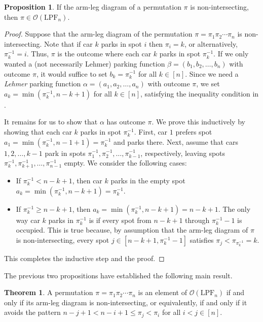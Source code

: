 \documentclass{amsart}
\newcommand{\IT}{\mathrm{LPF}}
\newcommand{\Out}{\mathcal{O}}
\theoremstyle{definition}
\newtheorem{theorem}{Theorem}[section]
\newtheorem{proposition}{Proposition}[section]
\theoremstyle{definition}
\theoremstyle{remark}
\begin{document}
\begin{proposition}\label{prop:backwards1}
   If the arm-leg diagram of a permutation $\pi$ is non-intersecting, then $\pi \in \Out (\IT_n)$. 
\end{proposition}
\begin{proof}
    Suppose that the arm-leg diagram of the permutation $\pi=\pi_1\pi_2\cdots\pi_n$ is non-intersecting.
    Note that if car $k$ parks in spot $i$ then $\pi_i=k$, or alternatively, $\pi_k^{-1}=i$. Thus, $\pi$ is the outcome where each car $k$ parks in spot $\pi_k^{-1}$.
    If we only wanted a (not necessarily Lehmer) parking function $\beta=(b_1,b_2,\ldots,b_n)$ with outcome $\pi$,
    it would suffice to set $b_k=\pi_k^{-1}$ for all $k\in[n]$.
    Since we need a \textit{Lehmer} parking function $\alpha=(a_1,a_2,\ldots,a_n)$ with outcome $\pi$, we set
    $a_k=\min(\pi_k^{-1},n-k+1)$ for all $k\in[n]$, satisfying the inequality condition in .

    It remains for us to show that $\alpha$ has outcome $\pi$. We prove this inductively by showing that each car $k$ parks in spot $\pi_k^{-1}$. First, car $1$ prefers spot $a_1=\min(\pi_k^{-1},n-1+1)=\pi_k^{-1}$ and parks there. Next, assume that cars $1,2,\ldots, k-1$ park in spots $\pi^{-1}_1,\pi^{-1}_2,\ldots,\pi^{-1}_{k-1}$, respectively, leaving spots $\pi^{-1}_k,\pi^{-1}_{k+1},\ldots,\pi^{-1}_{n-1}$ empty. We consider the following cases:
    \begin{itemize}
        \item If $\pi^{-1}_k<n-k+1$, then car $k$ parks in the empty spot $a_k=\min(\pi^{-1}_k,n-k+1)=\pi^{-1}_k$.
        \item If $\pi^{-1}_k\geq n-k+1$, then $a_k=\min(\pi^{-1}_k,n-k+1)=n-k+1$. The only way car $k$ parks in $\pi_k^{-1}$ is if every spot from $n-k+1$ through $\pi^{-1}_k-1$ is occupied. 
        This is true because, by assumption that the arm-leg diagram of $\pi$ is non-intersecting, every spot $j\in[n-k+1,\pi^{-1}_k-1]$ satisfies $\pi_j<\pi_{\pi^{-1}_k}=k$.
    \end{itemize}
    This completes the inductive step and the proof.\qedhere
\end{proof}

The previous two propositions have established the following main result.

\begin{theorem}\label{thm: characterization of inversion table outcomes}
    A permutation $\pi=\pi_1\pi_2\cdots\pi_n$ is an element of $\Out(\IT_n)$ 
    if and only if its arm-leg diagram is non-intersecting, or equivalently, if and only if it
    avoids the pattern $n-j+1<n-i+1\le \pi_j<\pi_i$ for all $i<j\in[n]$.
\end{theorem}
\end{document}
